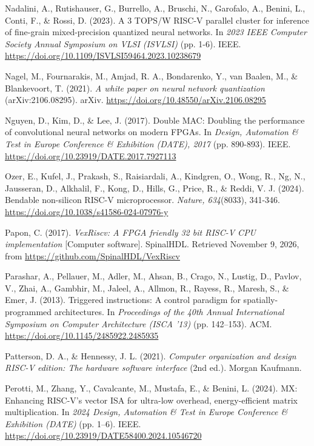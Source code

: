 \begin{apareferences}
Nadalini, A., Rutishauser, G., Burrello, A., Bruschi, N., Garofalo, A., Benini, L., Conti, F., \& Rossi, D. (2023). A 3 TOPS/W RISC-V parallel cluster for inference of fine-grain mixed-precision quantized neural networks. In \emph{2023 IEEE Computer Society Annual Symposium on VLSI (ISVLSI)} (pp. 1-6). IEEE. \url{https://doi.org/10.1109/ISVLSI59464.2023.10238679}

Nagel, M., Fournarakis, M., Amjad, R. A., Bondarenko, Y., van Baalen, M., \& Blankevoort, T. (2021). \emph{A white paper on neural network quantization} (arXiv:2106.08295). arXiv. \url{https://doi.org/10.48550/arXiv.2106.08295}

Nguyen, D., Kim, D., \& Lee, J. (2017). Double MAC: Doubling the performance of convolutional neural networks on modern FPGAs. In \emph{Design, Automation \& Test in Europe Conference \& Exhibition (DATE), 2017} (pp. 890-893). IEEE. \url{https://doi.org/10.23919/DATE.2017.7927113}

Ozer, E., Kufel, J., Prakash, S., Raisiardali, A., Kindgren, O., Wong, R., Ng, N., Jausseran, D., Alkhalil, F., Kong, D., Hills, G., Price, R., \& Reddi, V. J. (2024). Bendable non-silicon RISC-V microprocessor. \emph{Nature, 634}(8033), 341-346. \url{https://doi.org/10.1038/s41586-024-07976-y}

Papon, C. (2017). \emph{VexRiscv: A FPGA friendly 32 bit RISC-V CPU implementation} {[}Computer software{]}. SpinalHDL. Retrieved November 9, 2026, from \url{https://github.com/SpinalHDL/VexRiscv}

Parashar, A., Pellauer, M., Adler, M., Ahsan, B., Crago, N., Lustig, D., Pavlov, V., Zhai, A., Gambhir, M., Jaleel, A., Allmon, R., Rayess, R., Maresh, S., \& Emer, J. (2013). Triggered instructions: A control paradigm for spatially-programmed architectures. In \emph{Proceedings of the 40th Annual International Symposium on Computer Architecture (ISCA '13)} (pp. 142–153). ACM. \url{https://doi.org/10.1145/2485922.2485935}

Patterson, D. A., \& Hennessy, J. L. (2021). \emph{Computer organization and design RISC-V edition: The hardware software interface} (2nd ed.). Morgan Kaufmann.

Perotti, M., Zhang, Y., Cavalcante, M., Mustafa, E., \& Benini, L. (2024). MX: Enhancing RISC-V's vector ISA for ultra-low overhead, energy-efficient matrix multiplication. In \emph{2024 Design, Automation \& Test in Europe Conference \& Exhibition (DATE)} (pp. 1–6). IEEE. \url{https://doi.org/10.23919/DATE58400.2024.10546720}


\end{apareferences}

